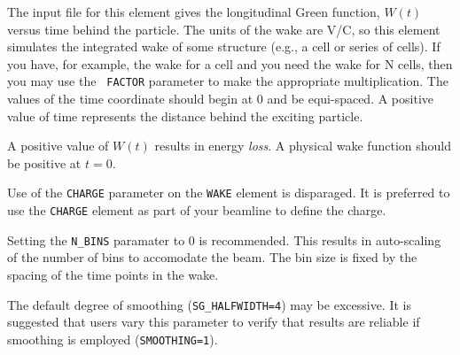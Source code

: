 The input file for this element gives the longitudinal Green function,
$W(t)$ versus time behind the particle. The units of the wake are V/C,
so this element simulates the integrated wake of some structure (e.g.,
a cell or series of cells).  If you have, for example, the wake for a
cell and you need the wake for N cells, then you may use the {\tt
FACTOR} parameter to make the appropriate multiplication.  The values
of the time coordinate should begin at 0 and be equi-spaced.  A
positive value of time represents the distance behind the exciting
particle.  

A positive value of $W(t)$ results in energy {\em loss}.  A physical
wake function should be positive at $t=0$.

Use of the {\tt CHARGE} parameter on the {\tt WAKE} element is
disparaged.  It is preferred to use the {\tt CHARGE} element as part
of your beamline to define the charge.  

Setting the {\tt N\_BINS} paramater to 0 is recommended.  This results
in auto-scaling of the number of bins to accomodate the beam.  The bin
size is fixed by the spacing of the time points in the wake.

The default degree of smoothing ({\tt SG\_HALFWIDTH=4}) may be excessive.
It is suggested that users vary this parameter to verify that results
are reliable if smoothing is employed ({\tt SMOOTHING=1}).

